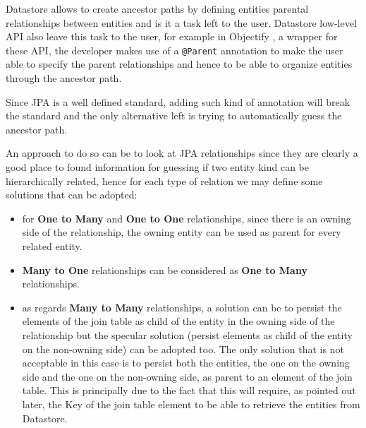 \noindent Datastore allows to create ancestor paths by defining entities parental relationships between entities and is it a task left to the user. Datastore low-level API also leave this task to the user, for example in Objectify \cite{online:objectify}, a wrapper for these API, the developer makes use of a \texttt{@Parent} annotation to make the user able to specify the parent relationships and hence to be able to organize entities through the ancestor path.

\noindent Since JPA is a well defined standard, adding such kind of annotation will break the standard and the only alternative left is trying to automatically guess the ancestor path.

\noindent An approach to do so can be to look at JPA relationships since they are clearly a good place to found information for guessing if two entity kind can be hierarchically related, hence for each type of relation we may define some solutions that can be adopted:
\begin{itemize}
\item for \textbf{One to Many} and \textbf{One to One} relationships, since there is an owning side of the relationship, the owning entity can be used as parent for every related entity. 
\item \textbf{Many to One} relationships can be considered as \textbf{One to Many} relationships. 
\item as regards \textbf{Many to Many} relationships, a solution can be to persist the elements of the join table as child of the entity in the owning side of the relationship but the specular solution (persist elements as child of the entity on the non-owning side) can be adopted too. The only solution that is not acceptable in this case is to persist both the entities, the one on the owning side and the one on the non-owning side, as parent to an element of the join table. This is principally due to the fact that this will require, as pointed out later, the Key of the join table element to be able to retrieve the entities from Datastore.
\end{itemize}

